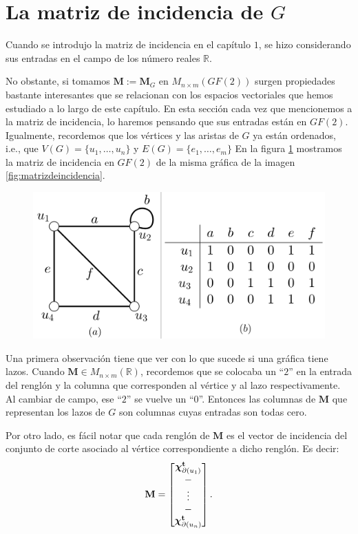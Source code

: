 \section{La matriz de incidencia de $G$}
Cuando se introdujo la matriz de incidencia en el capítulo $1$, se hizo considerando sus entradas en el campo de los número reales $\mathbb{R}$.

No obstante, si tomamos $\mathbf{M}:=\mathbf{M}_{G}$ en $M_{n \times m}(GF(2))$ surgen propiedades bastante interesantes que se relacionan con los espacios vectoriales que hemos estudiado a lo largo de este capítulo. En esta sección cada vez que mencionemos a la matriz de incidencia, lo haremos pensando que sus entradas están en $GF(2)$. Igualmente, recordemos que los vértices y las aristas de $G$ ya están ordenados, i.e., que $V(G)=\{u_{1}, \ldots, u_{n}\}$ y $E(G) = \{e_{1}, \ldots, e_{m}\}$
En la figura \ref{matrizdeincidenciagf2} mostramos la matriz de incidencia en $GF(2)$ de la misma gráfica de la imagen \ref{fig:matrizdeincidencia}.
\begin{figure}[H]
    \centering
    \includegraphics[scale=0.25]{img/imgchapter3/matrizdeincidenciagf2.jpg}
    \caption{}
    \label{matrizdeincidenciagf2}
\end{figure}

Una primera observación tiene que ver con lo que sucede si una gráfica tiene lazos. Cuando $\mathbf{M} \in M_{n \times m}(\mathbb{R})$, recordemos que se colocaba un ``$2$'' en la entrada del renglón y la columna que corresponden al vértice y al lazo respectivamente. Al cambiar de campo, ese ``$2$'' se vuelve un ``$0$''. Entonces las columnas de $\mathbf{M}$ que representan los lazos de $G$  son columnas cuyas entradas son todas cero.

Por otro lado, es fácil notar que cada renglón de $\mathbf{M}$ es el vector de incidencia del conjunto de corte asociado al vértice correspondiente a dicho renglón. Es decir:
$$\mathbf{M} = 
\begin{bmatrix}
\boldsymbol{\chi}_{\partial(u_{1})}^{\mathbf{t}}\\ 
\-- \\
\vdots \\
\-- \\
\boldsymbol{\chi}_{\partial(u_{n})}^{\mathbf{t}} 
\end{bmatrix}.
$$

